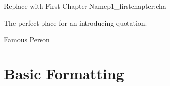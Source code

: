 


\begin{chapterpage}{Replace with First Chapter Name}{p1_firstchapter:cha}

\begin{myquotation} The perfect place for an introducing quotation.\par\vspace*{15mm}
\mbox{}\hfill \emdash{}Famous Person
\par\end{myquotation}

\end{chapterpage}



\section{Basic Formatting}\label{c1_basicformatting:sec}

